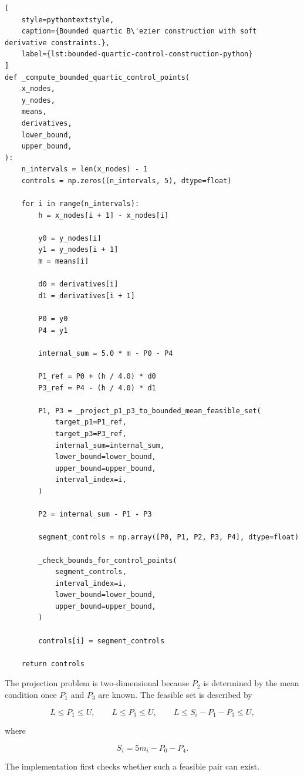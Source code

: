 \documentclass[12pt,a4paper]{article}
\begin{document}
\begin{lstlisting}[
    style=pythontextstyle,
    caption={Bounded quartic B\'ezier construction with soft derivative constraints.},
    label={lst:bounded-quartic-control-construction-python}
]
def _compute_bounded_quartic_control_points(
    x_nodes,
    y_nodes,
    means,
    derivatives,
    lower_bound,
    upper_bound,
):
    n_intervals = len(x_nodes) - 1
    controls = np.zeros((n_intervals, 5), dtype=float)

    for i in range(n_intervals):
        h = x_nodes[i + 1] - x_nodes[i]

        y0 = y_nodes[i]
        y1 = y_nodes[i + 1]
        m = means[i]

        d0 = derivatives[i]
        d1 = derivatives[i + 1]

        P0 = y0
        P4 = y1

        internal_sum = 5.0 * m - P0 - P4

        P1_ref = P0 + (h / 4.0) * d0
        P3_ref = P4 - (h / 4.0) * d1

        P1, P3 = _project_p1_p3_to_bounded_mean_feasible_set(
            target_p1=P1_ref,
            target_p3=P3_ref,
            internal_sum=internal_sum,
            lower_bound=lower_bound,
            upper_bound=upper_bound,
            interval_index=i,
        )

        P2 = internal_sum - P1 - P3

        segment_controls = np.array([P0, P1, P2, P3, P4], dtype=float)

        _check_bounds_for_control_points(
            segment_controls,
            interval_index=i,
            lower_bound=lower_bound,
            upper_bound=upper_bound,
        )

        controls[i] = segment_controls

    return controls
\end{lstlisting}

The projection problem is two-dimensional because \(P_2\) is determined by
the mean condition once \(P_1\) and \(P_3\) are known. The feasible set is
described by

\[
L\leq P_1\leq U,\qquad
L\leq P_3\leq U,\qquad
L\leq S_i-P_1-P_3\leq U,
\]

where

\[
S_i=5m_i-P_0-P_4.
\]

The implementation first checks whether such a feasible pair can exist.
\end{document}
